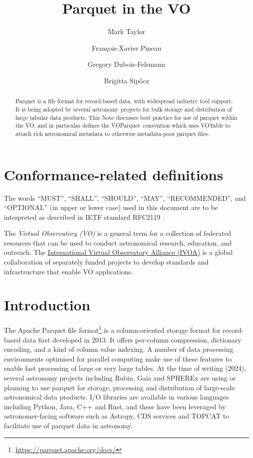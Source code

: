 \documentclass[11pt,a4paper]{ivoa}
\title{Parquet in the VO}
\author[https://wiki.ivoa.net/twiki/bin/view/IVOA/MarkTaylor]
       {Mark Taylor}
\author[https://wiki.ivoa.net/twiki/bin/view/IVOA/FrancoisXavierPineau]
       {Fran\c{c}ois-Xavier Pineau}
\author[https://wiki.ivoa.net/twiki/bin/view/IVOA/GregoryDuboisFelsmann]
       {Gregory Dubois-Felsmann}
\author{Brigitta Sip\H{o}cz}
\newcommand{\voparquet}{VOParquet}
\begin{document}
\begin{abstract}
Parquet is a file format for record-based data,
with widespread industry tool support.
It is being adopted by several astronomy projects for bulk storage and
distribution of large tabular data products.
This Note discusses best practice for use of parquet within the VO,
and in particular defines the \voparquet\ convention
which uses VOTable to attach rich astronomical metadata
to otherwise metadata-poor parquet files.
\end{abstract}

\section*{Conformance-related definitions}

The words ``MUST'', ``SHALL'', ``SHOULD'', ``MAY'', ``RECOMMENDED'', and
``OPTIONAL'' (in upper or lower case) used in this document are to be
interpreted as described in IETF standard RFC2119 \citep{std:RFC2119}.

The \emph{Virtual Observatory (VO)} is a
general term for a collection of federated resources that can be used
to conduct astronomical research, education, and outreach.
The \href{https://www.ivoa.net}{International
Virtual Observatory Alliance (IVOA)} is a global
collaboration of separately funded projects to develop standards and
infrastructure that enable VO applications.


\section{Introduction}
\label{sec:intro}

The Apache Parquet file
format\footnote{\url{https://parquet.apache.org/docs/}}
is a column-oriented storage format for record-based data
first developed in 2013.
It offers per-column compression, dictionary encoding, and
a kind of column value indexing.
A number of data processing environments optimised for parallel
computing make use of these features to enable fast processing
of large or very large tables.
At the time of writing (2024),
several astronomy projects including Rubin, Gaia and SPHEREx
are using or planning to use parquet for storage, processing
and distribution of large-scale astronomical data products.
I/O libraries are available in various languages including Python,
Java, C++ and Rust, and these have been leveraged by astronomer-facing
software such as Astropy, CDS services and TOPCAT to facilitate
use of parquet data in astronomy.
\end{document}
